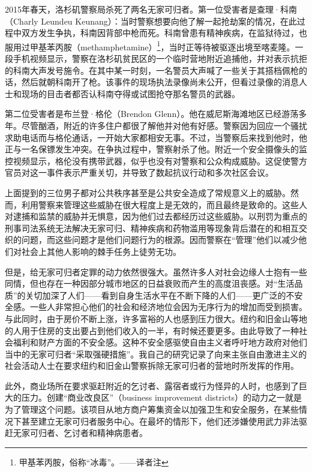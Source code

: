 \documentclass[fontset=fandol, a4paper, 12pt, openright]{ctexbook}
\begin{document}
2015年春天，洛杉矶警察局杀死了两名无家可归者。第一位受害者是查理·科南（Charly Leundeu Keunang）：当时警察想要向他了解一起抢劫案的情况，在此过程中双方发生争执，科南因背部中枪而死。科南曾患有精神疾病，在监狱待过，也服用过甲基苯丙胺（methamphetamine）\footnote{甲基苯丙胺，俗称“冰毒”。——译者注}，当时正等待被驱逐出境至喀麦隆。一段手机视频显示，警察在洛杉矶贫民区的一个临时营地附近追捕他，并对表示抗拒的科南大声发号施令。在其中某一时刻，一名警员大声喊了一些关于其搭档佩枪的话，然后就朝科南开了枪。该事件的现场执法录像尚未公开，但看过录像的消息人士和现场的目击者都否认科南夺得或试图抢夺那名警员的武器。

第二位受害者是布兰登·格伦（Brendon Glenn）。他在威尼斯海滩地区已经游荡多年。尽管酗酒，附近的许多住户都很了解他并对他有好感。警察因为回应一个骚扰求助电话而与格伦通话，一开始大家都相安无事。不过，当警察后来找到他时，他正与一名保镖发生冲突。在争执过程中，警察射杀了他。附近一个安全摄像头的监控视频显示，格伦没有携带武器，似乎也没有对警察和公众构成威胁。这促使警方官员对这一事件表示严重关切，并导致了数起抗议行动和多次社区会议。

上面提到的三位男子都对公共秩序甚至是公共安全造成了常规意义上的威胁。然而，利用警察来管理这些威胁在很大程度上是无效的，而且最终是致命的。这些人对逮捕和监禁的威胁并无惧意，因为他们过去都经历过这些威胁。以刑罚为重点的刑事司法系统无法解决无家可归、精神疾病和药物滥用等现象背后潜在的和相互交织的问题，而这些问题才是他们问题行为的根源。因而警察在“管理”他们以减少他们对社会上其他人影响的棘手任务上徒劳无功。

但是，给无家可归者定罪的动力依然很强大。虽然许多人对社会边缘人士抱有一些同情，但也存在一种因部分城市地区的日益衰败而产生的高度沮丧感。对“生活品质”的关切加深了人们——看到自身生活水平在不断下降的人们——更广泛的不安全感。一些人非常担心他们的社会和经济地位会因为无序行为的增加而受到损害。与此同时，由于房价不断上涨，许多富裕的人也感到压力很大。纽约和旧金山等地的人用于住房的支出要占到他们收入的一半，有时候还要更多。由此导致了一种社会福利和财产方面的不安全感。这种不安全感驱使自由主义者呼吁地方政府对他们当中的无家可归者“采取强硬措施”。我自己的研究记录了向来主张自由激进主义的社会活动人士在要求纽约和旧金山警察拆除无家可归者的营地时所发挥的作用。

此外，商业场所在要求驱赶附近的乞讨者、露宿者或行为怪异的人时，也感到了巨大的压力。创建“商业改良区”（business improvement districts）的动力之一就是为了管理这个问题。该项目从地方商户筹集资金以加强卫生和安全服务，在某些情况下甚至建立无家可归者服务中心。在最坏的情形下，他们还涉嫌使用武力非法驱赶无家可归者、乞讨者和精神病患者。
\end{document}

